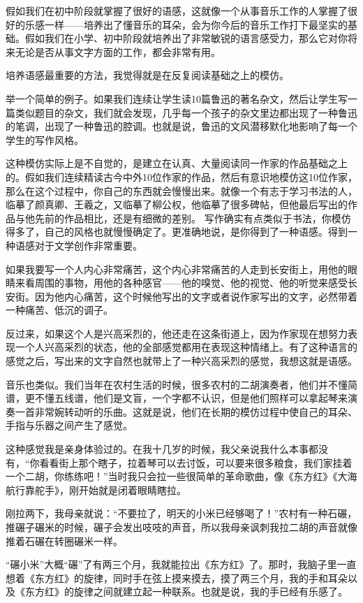 \documentclass[fontset=fandol,12pt,a5paper]{ctexbook}
\begin{document}
假如我们在初中阶段就掌握了很好的语感，这就像一个从事音乐工作的人掌握了很好的乐感一样——培养出了懂音乐的耳朵，会为你今后的音乐工作打下最坚实的基础。假如我们在小学、初中阶段就培养出了非常敏锐的语言感受力，那么它对你将来无论是否从事文字方面的工作，都会非常有用。

培养语感最重要的方法，我觉得就是在反复阅读基础之上的模仿。

举一个简单的例子。如果我们连续让学生读10篇鲁迅的著名杂文，然后让学生写一篇类似题目的杂文，我们就会发现，几乎每一个孩子的杂文里边都出现了一种鲁迅的笔调，出现了一种鲁迅的腔调。也就是说，鲁迅的文风潜移默化地影响了每一个学生的写作风格。

这种模仿实际上是不自觉的，是建立在认真、大量阅读同一作家的作品基础之上的。假如我们连续精读古今中外10位作家的作品，然后有意识地模仿这10位作家，那么在这个过程中，你自己的东西就会慢慢出来。就像一个有志于学习书法的人，临摹了颜真卿、王羲之，又临摹了柳公权，他临摹了很多碑帖，但他最后写出的作品与他先前的作品相比，还是有细微的差别。
写作确实有点类似于书法，你模仿得多了，自己的风格也就慢慢确定了。更准确地说，是你得到了一种语感。得到一种语感对于文学创作非常重要。

如果我要写一个人内心非常痛苦，这个内心非常痛苦的人走到长安街上，用他的眼睛来看周围的事物，用他的各种感官——他的嗅觉、他的视觉、他的听觉来感受长安街。因为他内心痛苦，这个时候他写出的文字或者说作家写出的文字，必然带着一种痛苦、低沉的调子。

反过来，如果这个人是兴高采烈的，他还走在这条街道上，因为作家现在想努力表现一个人兴高采烈的状态，他的全部感觉都用在表现这种情绪上。有了这种语言的感觉之后，写出来的文字自然也就带上了一种兴高采烈的感觉，我想这就是语感。

音乐也类似。我们当年在农村生活的时候，很多农村的二胡演奏者，他们并不懂简谱，更不懂五线谱，他们是文盲，一个字都不认识，但是他们照样可以拿起琴来演奏一首非常婉转动听的乐曲。这就是说，他们在长期的模仿过程中使自己的耳朵、手指与乐器之间产生了感觉。

这种感觉我是亲身体验过的。在我十几岁的时候，我父亲说我什么本事都没有，“你看看街上那个瞎子，拉着琴可以去讨饭，可以要来很多粮食，我们家挂着一个二胡，你练练吧！”当时我只会拉一些很简单的革命歌曲，像《东方红》《大海航行靠舵手》，刚开始就是闭着眼睛瞎拉。

刚拉两下，我母亲就说：“不要拉了，明天的小米已经够喝了！”农村有一种石碾，推碾子碾米的时候，碾子会发出吱吱的声音，所以我母亲讽刺我拉二胡的声音就像推着石碾在转圈碾米一样。

“碾小米”大概“碾”了有两三个月，我就能拉出《东方红》了。那时，我脑子里一直想着《东方红》的旋律，同时手在弦上摸来摸去，摸了两三个月，我的手和耳朵以及《东方红》的旋律之间就建立起一种联系。也就是说，我的手已经有乐感了。
\end{document}
